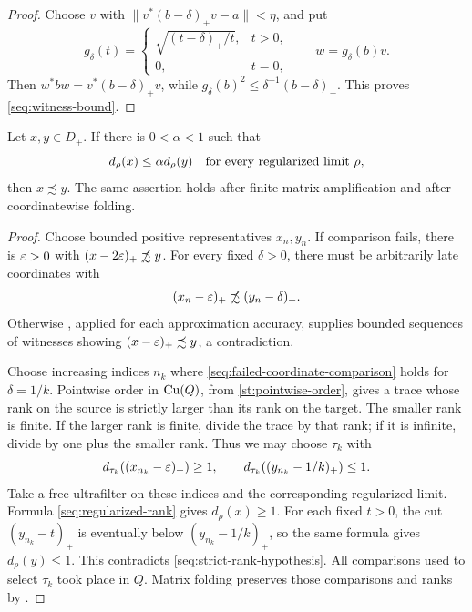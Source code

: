 \begin{proof}
Choose \(v\) with
\(\|v^*(b-\delta)_+v-a\|<\eta\), and put
\[
 g_\delta(t)=
 \begin{cases}
  \sqrt{(t-\delta)_+/t},&t>0,\\
  0,&t=0,
 \end{cases}
 \qquad w=g_\delta(b)v.
\]
Then \(w^*bw=v^*(b-\delta)_+v\), while
\(g_\delta(b)^2\leq\delta^{-1}(b-\delta)_+\).
This proves \eqref{seq:witness-bound}.
\end{proof}

\begin{lemma}
\label{seq:strict-comparison}
Let \(x,y\in D_+\). If there is \(0<\alpha<1\) such that
\begin{equation}\label{seq:strict-rank-hypothesis}
 d_\rho(x)\leq\alpha d_\rho(y)
 \quad\hbox{for every regularized limit }\rho,
\end{equation}
then \(x\precsim y\). The same assertion holds after finite
matrix amplification and after coordinatewise folding.
\end{lemma}

\begin{proof}
Choose bounded positive representatives \(x_n,y_n\).
If comparison fails, there is \(\varepsilon>0\) with
\((x-2\varepsilon)_+\not\precsim y\).
For every fixed \(\delta>0\), there must be arbitrarily late
coordinates with
\begin{equation}\label{seq:failed-coordinate-comparison}
 (x_n-\varepsilon)_+\not\precsim(y_n-\delta)_+.
\end{equation}
Otherwise , applied for each approximation
accuracy, supplies bounded sequences of witnesses showing
\((x-\varepsilon)_+\precsim y\), a contradiction.

Choose increasing indices \(n_k\) where
\eqref{seq:failed-coordinate-comparison} holds for \(\delta=1/k\).
Pointwise order in \(\operatorname{Cu}(Q)\), from
\eqref{st:pointwise-order}, gives a trace whose rank on the source
is strictly larger than its rank on the target. The smaller rank is
finite. If the larger rank is finite, divide the trace by that rank;
if it is infinite, divide by one plus the smaller rank. Thus we may
choose \(\tau_k\) with
\[
 d_{\tau_k}((x_{n_k}-\varepsilon)_+)\geq1,
 \qquad
 d_{\tau_k}((y_{n_k}-1/k)_+)\leq1.
\]
Take a free ultrafilter on these indices and the corresponding
regularized limit. Formula \eqref{seq:regularized-rank} gives
\(d_\rho(x)\geq1\). For each fixed \(t>0\), the cut
\((y_{n_k}-t)_+\) is eventually below
\((y_{n_k}-1/k)_+\), so the same formula gives
\(d_\rho(y)\leq1\). This contradicts
\eqref{seq:strict-rank-hypothesis}. All comparisons used to select
\(\tau_k\) took place in \(Q\). Matrix folding preserves those
comparisons and ranks by .
\end{proof}


